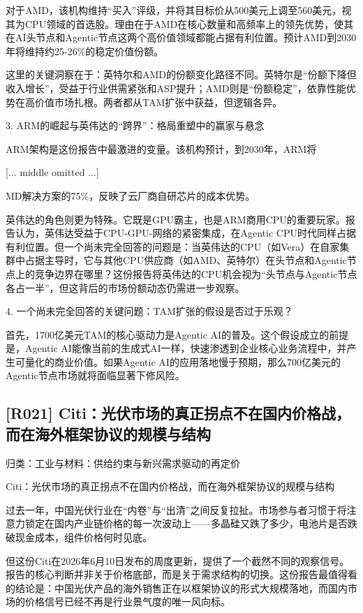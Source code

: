 \documentclass[11pt]{ctexart}
\begin{document}
对于AMD，该机构维持“买入”评级，并将其目标价从500美元上调至560美元，视其为CPU领域的首选股。理由在于AMD在核心数量和高频率上的领先优势，使其在AI头节点和Agentic节点这两个高价值领域都能占据有利位置。预计AMD到2030年将维持约25-26\%的稳定价值份额。

这里的关键洞察在于：英特尔和AMD的份额变化路径不同。英特尔是“份额下降但收入增长”，受益于行业供需紧张和ASP提升；AMD则是“份额稳定”，依靠性能优势在高价值市场扎根。两者都从TAM扩张中获益，但逻辑各异。

3. ARM的崛起与英伟达的“跨界”：格局重塑中的赢家与悬念

ARM架构是这份报告中最激进的变量。该机构预计，到2030年，ARM将

[... middle omitted ...]

MD解决方案的75\%，反映了云厂商自研芯片的成本优势。

英伟达的角色则更为特殊。它既是GPU霸主，也是ARM商用CPU的重要玩家。报告认为，英伟达受益于CPU-GPU-网络的紧密集成，在Agentic CPU时代同样占据有利位置。但一个尚未完全回答的问题是：当英伟达的CPU（如Vera）在自家集群中占据主导时，它与其他CPU供应商（如AMD、英特尔）在头节点和Agentic节点上的竞争边界在哪里？这份报告将英伟达的CPU机会视为“头节点与Agentic节点各占一半”，但这背后的市场份额动态仍需进一步观察。

4. 一个尚未完全回答的关键问题：TAM扩张的假设是否过于乐观？

首先，1700亿美元TAM的核心驱动力是Agentic AI的普及。这个假设成立的前提是，Agentic AI能像当前的生成式AI一样，快速渗透到企业核心业务流程中，并产生可量化的商业价值。如果Agentic AI的应用落地慢于预期，那么700亿美元的Agentic节点市场就将面临显著下修风险。

\subsection{[R021] Citi：光伏市场的真正拐点不在国内价格战，而在海外框架协议的规模与结构}
{\small\color{refgray}归类：工业与材料：供给约束与新兴需求驱动的再定价}

Citi：光伏市场的真正拐点不在国内价格战，而在海外框架协议的规模与结构

过去一年，中国光伏行业在“内卷”与“出清”之间反复拉扯。市场参与者习惯于将注意力锁定在国内产业链价格的每一次波动上——多晶硅又跌了多少，电池片是否跌破现金成本，组件价格何时见底。

但这份Citi在2026年6月10日发布的周度更新，提供了一个截然不同的观察信号。报告的核心判断并非关于价格底部，而是关于需求结构的切换。这份报告最值得看的结论是：中国光伏产品的海外销售正在以框架协议的形式大规模落地，而国内市场的价格信号已经不再是行业景气度的唯一风向标。
\end{document}
